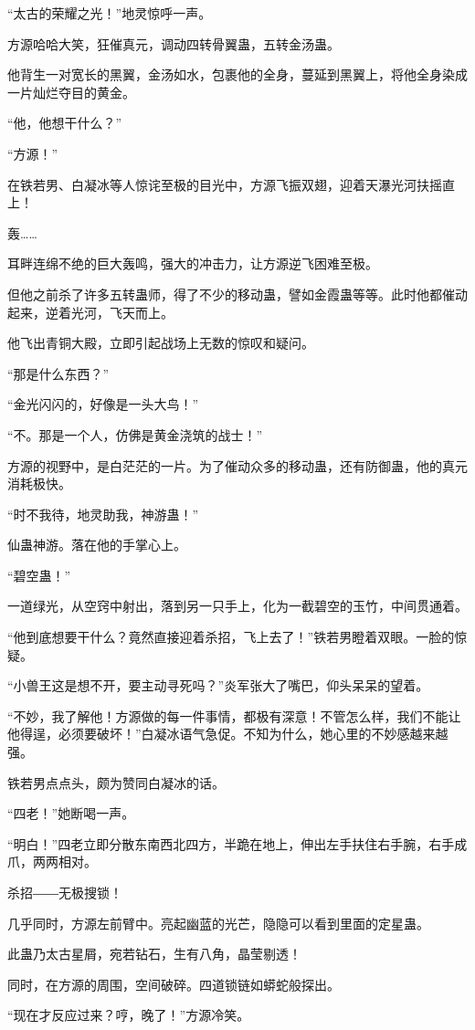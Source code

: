 \begin{this_body}
“太古的荣耀之光！”地灵惊呼一声。

方源哈哈大笑，狂催真元，调动四转骨翼蛊，五转金汤蛊。

他背生一对宽长的黑翼，金汤如水，包裹他的全身，蔓延到黑翼上，将他全身染成一片灿烂夺目的黄金。

“他，他想干什么？”

“方源！”

在铁若男、白凝冰等人惊诧至极的目光中，方源飞振双翅，迎着天瀑光河扶摇直上！

轰……

耳畔连绵不绝的巨大轰鸣，强大的冲击力，让方源逆飞困难至极。

但他之前杀了许多五转蛊师，得了不少的移动蛊，譬如金霞蛊等等。此时他都催动起来，逆着光河，飞天而上。

他飞出青铜大殿，立即引起战场上无数的惊叹和疑问。

“那是什么东西？”

“金光闪闪的，好像是一头大鸟！”

“不。那是一个人，仿佛是黄金浇筑的战士！”

方源的视野中，是白茫茫的一片。为了催动众多的移动蛊，还有防御蛊，他的真元消耗极快。

“时不我待，地灵助我，神游蛊！”

仙蛊神游。落在他的手掌心上。

“碧空蛊！”

一道绿光，从空窍中射出，落到另一只手上，化为一截碧空的玉竹，中间贯通着。

“他到底想要干什么？竟然直接迎着杀招，飞上去了！”铁若男瞪着双眼。一脸的惊疑。

“小兽王这是想不开，要主动寻死吗？”炎军张大了嘴巴，仰头呆呆的望着。

“不妙，我了解他！方源做的每一件事情，都极有深意！不管怎么样，我们不能让他得逞，必须要破坏！”白凝冰语气急促。不知为什么，她心里的不妙感越来越强。

铁若男点点头，颇为赞同白凝冰的话。

“四老！”她断喝一声。

“明白！”四老立即分散东南西北四方，半跪在地上，伸出左手扶住右手腕，右手成爪，两两相对。

杀招――无极搜锁！

几乎同时，方源左前臂中。亮起幽蓝的光芒，隐隐可以看到里面的定星蛊。

此蛊乃太古星屑，宛若钻石，生有八角，晶莹剔透！

同时，在方源的周围，空间破碎。四道锁链如蟒蛇般探出。

“现在才反应过来？哼，晚了！”方源冷笑。


\end{this_body}
